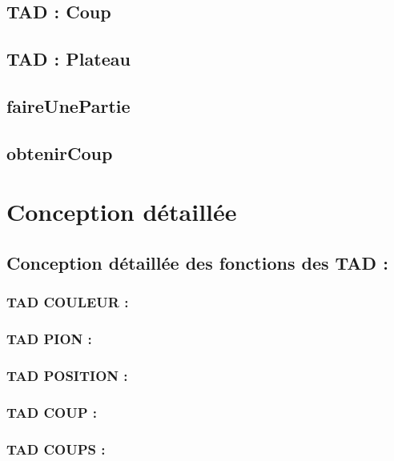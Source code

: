 \documentclass{article}
\begin{document}
\subsection{TAD : Coup}


\subsection{TAD : Plateau}


\subsection{faireUnePartie}


\subsection{obtenirCoup}




\section{Conception détaillée}
\subsection{Conception détaillée des fonctions des TAD :}

\subsubsection{TAD COULEUR :}


\subsubsection{TAD PION :}


\subsubsection{TAD POSITION :}


\subsubsection{TAD COUP :}


\subsubsection{TAD COUPS :}

\end{document}
